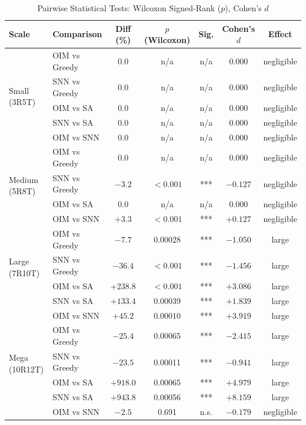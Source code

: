 \begin{table}[!htpb]
\caption{Pairwise Statistical Tests: Wilcoxon Signed-Rank ($p$), Cohen's $d$}
\label{tab:stats}
\centering\small
\begin{tabular}{llccccc}
\toprule
\textbf{Scale} & \textbf{Comparison} & \textbf{Diff (\%)} &
  \textbf{$p$ (Wilcoxon)} & \textbf{Sig.} &
  \textbf{Cohen's $d$} & \textbf{Effect} \\
\midrule
\multirow{5}{*}{Small (3R5T)}
  & OIM vs Greedy  &  0.0 & n/a   & n/a  & 0.000 & negligible \\
  & SNN vs Greedy  &  0.0 & n/a   & n/a  & 0.000 & negligible \\
  & OIM vs SA      &  0.0 & n/a   & n/a  & 0.000 & negligible \\
  & SNN vs SA      &  0.0 & n/a   & n/a  & 0.000 & negligible \\
  & OIM vs SNN     &  0.0 & n/a   & n/a  & 0.000 & negligible \\
\midrule
\multirow{4}{*}{Medium (5R8T)}
  & OIM vs Greedy  &  0.0 & n/a   & n/a  & 0.000 & negligible \\
  & SNN vs Greedy  & $-3.2$ & $<0.001$ & *** & $-0.127$ & negligible \\
  & OIM vs SA      &  0.0 & n/a   & n/a  & 0.000 & negligible \\
  & OIM vs SNN     & $+3.3$ & $<0.001$ & *** & $+0.127$ & negligible \\
\midrule
\multirow{4}{*}{Large (7R10T)}
  & OIM vs Greedy  & $-7.7$  & 0.00028 & *** & $-1.050$ & large \\
  & SNN vs Greedy  & $-36.4$ & $<0.001$ & *** & $-1.456$ & large \\
  & OIM vs SA      & $+238.8$& $<0.001$ & *** & $+3.086$ & large \\
  & SNN vs SA      & $+133.4$& 0.00039 & *** & $+1.839$ & large \\
  & OIM vs SNN     & $+45.2$ & 0.00010 & *** & $+3.919$ & large \\
\midrule
\multirow{4}{*}{Mega (10R12T)}
  & OIM vs Greedy  & $-25.4$ & 0.00065 & *** & $-2.415$ & large \\
  & SNN vs Greedy  & $-23.5$ & 0.00011 & *** & $-0.941$ & large \\
  & OIM vs SA      & $+918.0$& 0.00065 & *** & $+4.979$ & large \\
  & SNN vs SA      & $+943.8$& 0.00056 & *** & $+8.159$ & large \\
  & OIM vs SNN     &  $-2.5$ & 0.691   & n.s.& $-0.179$ & negligible \\
\bottomrule
\end{tabular}
\end{table}

